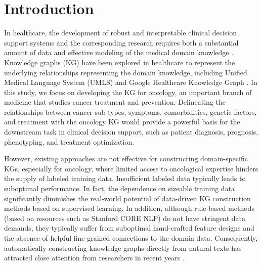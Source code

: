 \documentclass[sigconf]{acmart}
\begin{document}
\section{Introduction}
In healthcare, the development of robust and interpretable clinical decision support systems and the corresponding research requires both a substantial amount of data and effective modeling of the medical domain knowledge \cite{ZHANG2020102324}. Knowledge graphs (KG) have been explored in healthcare to represent the underlying relationships representing the domain knowledge, including Unified Medical Language System (UMLS) \cite{lindberg1993unified} and Google Healthcare Knowledge Graph \cite{rotmensch2017learning}. In this study, we focus on developing the KG for oncology, an important branch of medicine that studies cancer treatment and prevention. Delineating the relationships between cancer sub-types, symptoms, comorbidities, genetic factors, and treatment with the oncology KG would provide a powerful basis for the downstream task in clinical decision support, such as patient diagnosis, prognosis, phenotyping, and treatment optimization.

However, existing approaches are not effective for constructing domain-specific KGs, especially for oncology, where limited access to oncological expertise hinders the supply of labeled training data. Insufficient labeled data typically leads to suboptimal performance. In fact, the dependence on sizeable training data significantly diminishes the real-world potential of data-driven KG construction methods based on supervised learning. In addition, although rule-based methods (based on resources such as Stanford CORE NLP) do not have stringent data demands, they typically suffer from suboptimal hand-crafted feature designs and the absence of helpful fine-grained connections to the domain data. Consequently, automatically constructing knowledge graphs directly from natural texts has attracted close attention from researchers in recent years \cite{kertkeidkachorn2017t2kg,rossanez2020kgen,stewart2020seq2kg}.
\end{document}

